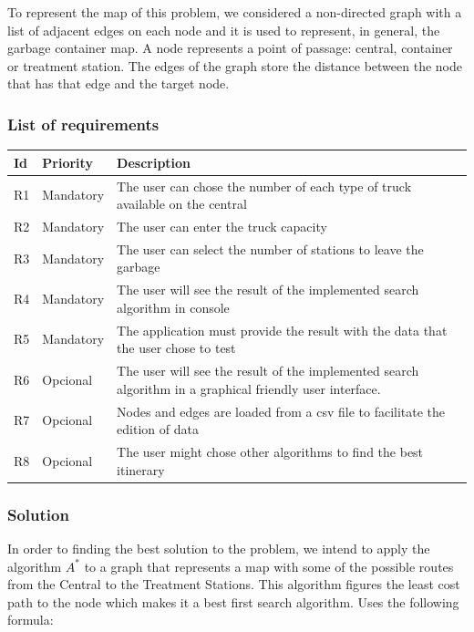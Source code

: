 \documentclass[a4paper]{article}
\begin{document}
To represent the map of this problem, we considered a non-directed graph with a list of adjacent edges on each node and it is used to represent, in general, the garbage container map. A node represents a point of passage: central, container or treatment station. The edges of the graph store the distance between the node that has that edge and the target node.

\subsubsection{List of requirements}\label{subsecsec:requirements}

\begin{table}[H]
	\centering
	\label{tab:list-of-requirements}
	\begin{tabular}{|l|l|p{9cm}|}
		\hline
		\textbf{Id} & \textbf{Priority} & \textbf{Description} \\ \hline
		R1 & Mandatory        & The user can chose the number of each type of truck available on the central  \\ \hline
		R2 & Mandatory         & The user can enter the truck capacity \\ \hline
		R3 & Mandatory          & The user can select the number of stations to leave the garbage \\ \hline
		R4 & Mandatory         & The user will see the result of the implemented search algorithm in console \\ \hline
		R5 & Mandatory         & The application must provide the result with the data that the user chose to test \\ \hline
		R6 & Opcional         & The user will see the result of the implemented search algorithm in a graphical friendly user interface.\\ \hline
		R7 & Opcional         & Nodes and edges are loaded from a csv file to facilitate the edition of data \\ \hline
		R8 & Opcional         & The user might chose other algorithms to find the best itinerary \\ \hline
	\end{tabular}
\end{table}

\subsubsection{Solution}\label{solution}

In order to finding the best solution to the problem, we intend to apply the algorithm $A^*$ to a graph that represents a map with some of the possible routes from the Central to the Treatment Stations. This algorithm figures the least cost path to the node which makes it a best first search algorithm. Uses the following formula:
\end{document}
